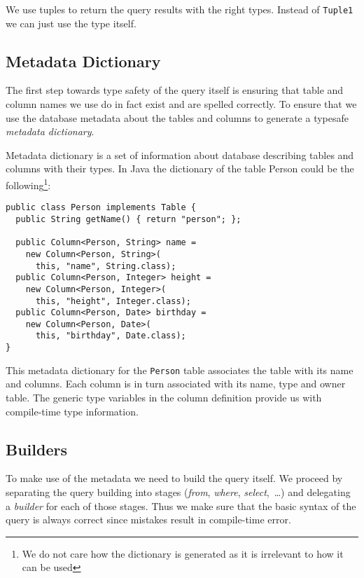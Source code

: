 \documentclass{sig-alternate}
\begin{document}
We use tuples to return the query results with the right types. Instead of \verb!Tuple1! we can just use the type itself.

\subsection{Metadata Dictionary}

The first step towards type safety of the query itself is ensuring that table and column names we use do in fact exist and are spelled correctly. To ensure that we use the database metadata about the tables and columns to generate a typesafe \emph{metadata dictionary}.

Metadata dictionary is a set of information about database describing tables and columns with their types. In Java the dictionary of the table Person could be the following\footnote{We do not care how the dictionary is generated as it is irrelevant to how it can be used}:

\begin{verbatim}
public class Person implements Table {
  public String getName() { return "person"; };

  public Column<Person, String> name = 
    new Column<Person, String>(
      this, "name", String.class);
  public Column<Person, Integer> height = 
    new Column<Person, Integer>(
      this, "height", Integer.class);
  public Column<Person, Date> birthday = 
    new Column<Person, Date>(
      this, "birthday", Date.class);
}
\end{verbatim}

This metadata dictionary for the \verb!Person! table associates the table with
its name and columns. Each column is in turn associated with its name, type and
owner table. The generic type variables in the column definition provide us
with compile-time type information.

\subsection{Builders}

To make use of the metadata we need to build the query itself. We proceed by separating the query building into stages (\emph{from}, \emph{where}, \emph{select},~\ldots) and delegating a \emph{builder} for each of those stages. Thus we make sure that the basic syntax of the query is always correct since mistakes result in compile-time error.
\end{document}
